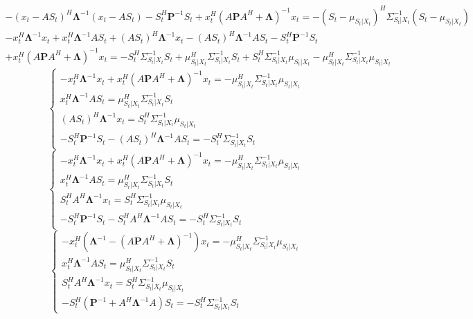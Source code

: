 \documentclass[11pt]{article}
\begin{document}
\begin{center}
\fontsize{16}{20}\selectfont {}
\end{center}
\begin{gather*}
-(x_t-A S_t)^H \mathbf{\Lambda}^{-1}(x_t-A S_t)-S_t^H\mathbf{P}^{-1}S_t+x_t^H (A\mathbf{P}  A^H + \mathbf{\Lambda})^{-1}x_t = -(S_t-\mu_{S_t|X_t})^H \Sigma_{S_t|X_t}^{-1}(S_t-\mu_{S_t|X_t})
\nonumber
\end{gather*}
\begin{gather*}
-x_t^H\mathbf{\Lambda}^{-1}x_t + x_t^H\mathbf{\Lambda}^{-1}A S_t + (A S_t)^H\mathbf{\Lambda}^{-1}x_t - (A S_t)^H \mathbf{\Lambda}^{-1} A S_t -S_t^H\mathbf{P}^{-1}S_t \\
+x_t^H (A\mathbf{P}  A^H + \mathbf{\Lambda})^{-1}x_t  =-S_t^H \Sigma_{S_t|X_t}^{-1}S_t + \mu_{S_t|X_t}^H  \Sigma_{S_t|X_t}^{-1}S_t   + S_t^H \Sigma_{S_t|X_t}^{-1}\mu_{S_t|X_t} - \mu_{S_t|X_t}^H \Sigma_{S_t|X_t}^{-1}\mu_{S_t|X_t}
\end{gather*}
\begin{equation*}
\left\{ \begin{aligned} 
 -x_t^H\mathbf{\Lambda}^{-1}x_t + x_t^H (A\mathbf{P}  A^H + \mathbf{\Lambda})^{-1}x_t = -\mu_{S_t|X_t}^H \Sigma_{S_t|X_t}^{-1}\mu_{S_t|X_t}\\
x_t^H\mathbf{\Lambda}^{-1}A S_t = \mu_{S_t|X_t}^H  \Sigma_{S_t|X_t}^{-1}S_t \\
(A S_t)^H\mathbf{\Lambda}^{-1}x_t = S_t^H \Sigma_{S_t|X_t}^{-1}\mu_{S_t|X_t} \\
-S_t^H\mathbf{P}^{-1}S_t - (A S_t)^H \mathbf{\Lambda}^{-1} A S_t = -S_t^H \Sigma_{S_t|X_t}^{-1}S_t
\end{aligned} \right.
\end{equation*}
\begin{equation*}
\left\{ \begin{aligned} 
 -x_t^H\mathbf{\Lambda}^{-1}x_t + x_t^H (A\mathbf{P}  A^H + \mathbf{\Lambda})^{-1}x_t = -\mu_{S_t|X_t}^H \Sigma_{S_t|X_t}^{-1}\mu_{S_t|X_t}\\
x_t^H\mathbf{\Lambda}^{-1}A S_t = \mu_{S_t|X_t}^H  \Sigma_{S_t|X_t}^{-1}S_t \\
S_t^H A^H\mathbf{\Lambda}^{-1}x_t = S_t^H \Sigma_{S_t|X_t}^{-1}\mu_{S_t|X_t} \\
-S_t^H\mathbf{P}^{-1}S_t - S_t^H A^H \mathbf{\Lambda}^{-1} A S_t = -S_t^H \Sigma_{S_t|X_t}^{-1}S_t
\end{aligned} \right.
\end{equation*}
\begin{equation*}
\left\{ \begin{aligned} 
 -x_t^H(\mathbf{\Lambda}^{-1}- (A\mathbf{P}  A^H+\mathbf{\Lambda})^{-1})x_t  = -\mu_{S_t|X_t}^H \Sigma_{S_t|X_t}^{-1}\mu_{S_t|X_t}\\
x_t^H\mathbf{\Lambda}^{-1}A S_t = \mu_{S_t|X_t}^H  \Sigma_{S_t|X_t}^{-1}S_t \\
S_t^H A^H\mathbf{\Lambda}^{-1}x_t = S_t^H \Sigma_{S_t|X_t}^{-1}\mu_{S_t|X_t} \\
-S_t^H(\mathbf{P}^{-1}+A^H \mathbf{\Lambda}^{-1} A)S_t = -S_t^H \Sigma_{S_t|X_t}^{-1}S_t
\end{aligned} \right.
\end{equation*}
\end{document}
